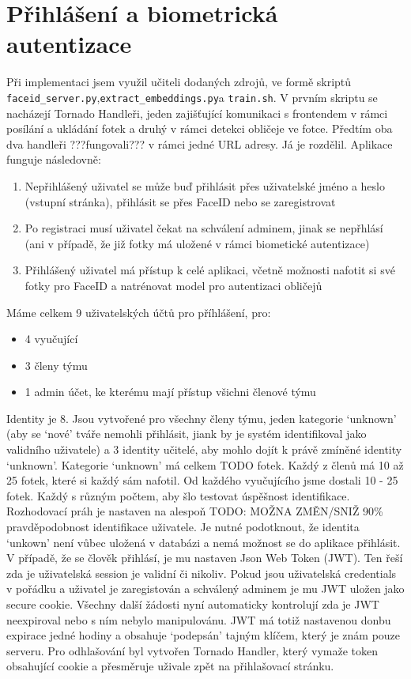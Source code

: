 \section{Přihlášení a biometrická autentizace}
Při implementaci jsem využil učiteli dodaných zdrojů, ve formě skriptů \verb|faceid_server.py|,\newline \verb|extract_embeddings.py|a \verb|train.sh|.
V prvním skriptu se nacházejí Tornado Handleři, jeden zajišťující komunikaci s frontendem v rámci posílání a ukládání fotek a druhý v rámci detekci obličeje ve fotce.
Předtím oba dva handleři ???fungovali??? v rámci jedné URL adresy. Já je rozdělil. Aplikace funguje následovně:
\begin{enumerate}
    \item Nepřihlášený uživatel se může buď přihlásit přes uživatelské jméno a heslo (vstupní stránka), přihlásit se přes FaceID nebo se zaregistrovat
    \item Po registraci musí uživatel čekat na schválení adminem, jinak se nepřhlásí (ani v případě, že již fotky má uložené v rámci biometické autentizace)
    \item Přihlášený uživatel má přístup k celé aplikaci, včetně možnosti nafotit si své fotky pro FaceID a natrénovat model pro autentizaci obličejů
\end{enumerate} 

Máme celkem 9 uživatelských účtů pro příhlášení, pro: 
\begin{itemize}
    \item 4 vyučující%
    \item 3 členy týmu
    \item 1 admin účet, ke kterému mají přístup všichni členové týmu
\end{itemize}
Identity je 8. Jsou vytvořené pro všechny členy týmu, jeden kategorie `unknown' (aby se `nové' tváře nemohli přihlásit, jiank by je systém identifikoval jako validního uživatele) a 3 identity učitelé, aby mohlo dojít k právě zmíněné identity `unknown'.
Kategorie `unknown' má celkem TODO fotek.
Každý z členů má 10 až 25 fotek, které si každý sám nafotil.
Od každého vyučujícího jsme dostali 10 - 25 fotek. Každý s různým počtem, aby šlo testovat úspěšnost identifikace.
Rozhodovací práh je nastaven na alespoň TODO: MOŽNA ZMĚN/SNIŽ 90\% pravděpodobnost identifikace uživatele. 
Je nutné podotknout, že identita `unkown' není vůbec uložená v databázi a nemá možnost se do aplikace přihlásit.
V případě, že se člověk přihlásí, je mu nastaven Json Web Token (JWT). Ten řeší zda je uživatelská session je validní či nikoliv.
Pokud jsou uživatelská credentials v pořádku a uživatel je zaregistován a schválený adminem je mu JWT uložen jako secure cookie.
Všechny další žádosti nyní automaticky kontrolují zda je JWT neexpiroval nebo s ním nebylo manipulovánu. 
JWT má totiž nastavenou donbu expirace jedné hodiny a obsahuje `podepsán' tajným klíčem, který je znám pouze serveru.  
Pro odhlašování byl vytvořen Tornado Handler, který vymaže token obsahující cookie a přesměruje uživale zpět na přihlašovací stránku.